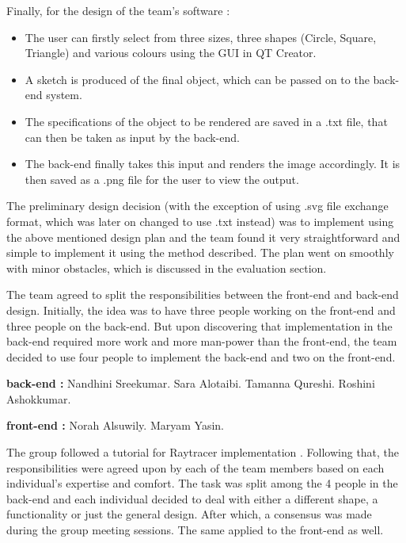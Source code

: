 \documentclass{article}
\begin{document}
\begin{itemize}
Finally, for the design of the team’s software :
\begin{itemize}
    \item 	The user can firstly select from three sizes, three shapes (Circle, Square, Triangle) and various colours using the GUI in QT Creator. 
\item	A sketch is produced of the final object, which can be passed on to the back-end system.
\item	The specifications of the object to be rendered are saved in a .txt file, that can then be taken as input by the back-end.
\item	The back-end finally takes this input and renders the image accordingly. It is then saved as a .png file for the user to view the output.
\end{itemize}
The preliminary design decision (with the exception of using .svg file exchange format, which was later on changed to use .txt instead) was to implement using the above mentioned design plan and the team found it very straightforward and simple to implement it using the method described. The plan went on smoothly with minor obstacles, which is discussed in the evaluation section. 

The team agreed to split the responsibilities between the front-end and back-end design. Initially, the idea was to have three people working on the front-end and three people on the back-end. But upon discovering that implementation in the back-end required more work and more man-power than the front-end, the team decided to use four people to implement the back-end and two on the front-end.
\newline

\textbf{back-end :} \newline
Nandhini Sreekumar. \newline Sara Alotaibi. \newline Tamanna Qureshi. \newline Roshini Ashokkumar.

\textbf{front-end :} \newline
Norah Alsuwily. \newline Maryam Yasin.

The group followed a tutorial for Raytracer implementation \cite{11}. Following that, the responsibilities were agreed upon by each of the team members based on each individual’s expertise and comfort. The task was split among the 4 people in the back-end and each individual decided to deal with either a different shape, a functionality or just the general design. After which, a consensus was made during the group meeting sessions. The same applied to the front-end as well. 


\end{itemize}
\end{document}
